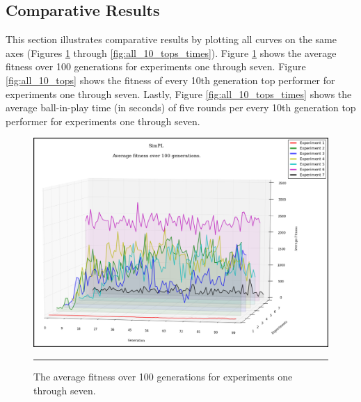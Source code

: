 \newpage

\subsection{Comparative Results}
\label{ssec:comparative_results}

This section illustrates comparative results by plotting all curves on the same axes (Figures \ref{fig:all_avg_fit} through \ref{fig:all_10_tops_times}). Figure \ref{fig:all_avg_fit} shows the average fitness over 100 generations for experiments one through seven. Figure \ref{fig:all_10_tops} shows the fitness of every 10th generation top performer for experiments one through seven. Lastly, Figure \ref{fig:all_10_tops_times} shows the average ball-in-play time (in seconds) of five rounds per every 10th generation top performer for experiments one through seven.  


\begin{figure}[ht!]  
  \centering
  \includegraphics[width=5in]{../Figures/Chapter3/all_avg_fit.png}
  \rule{35em}{0.5pt}
  \caption[Average Fitness Composite]{The average fitness over 100 generations for experiments one through seven.}
  \label{fig:all_avg_fit}
\end{figure}


